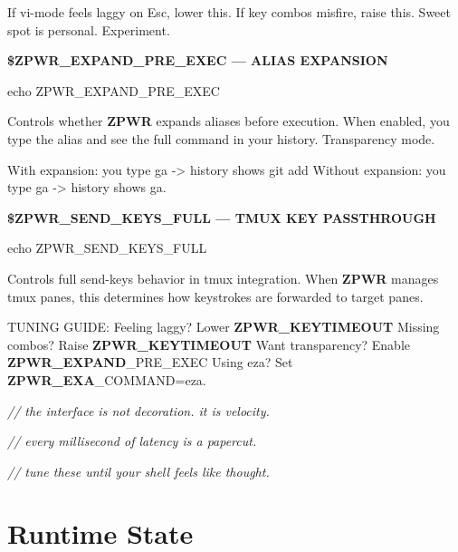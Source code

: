\documentclass[11pt,a4paper,twoside]{book}
\begin{document}
If vi-mode feels laggy on Esc, lower this. If key combos misfire, raise this. Sweet spot is personal. Experiment.


\vspace{12pt}
{\bfseries\color{neonyellow} \$\textbf{ZPWR\_EXPAND}\_PRE\_EXEC — ALIAS EXPANSION}\vspace{4pt}

\begin{codebox}
\color{neongreen}echo ZPWR\_EXPAND\_PRE\_EXEC\\
\end{codebox}

Controls whether \textbf{ZPWR} expands aliases before execution. When enabled, you type the alias and see the full command in your history. Transparency mode.

With expansion:    you type ga  -> history shows git add Without expansion: you type ga  -> history shows ga.


\vspace{12pt}
{\bfseries\color{neonyellow} \$\textbf{ZPWR\_SEND}\_KEYS\_FULL — TMUX KEY PASSTHROUGH}\vspace{4pt}

\begin{codebox}
\color{neongreen}echo ZPWR\_SEND\_KEYS\_FULL\\
\end{codebox}

Controls full send-keys behavior in tmux integration. When \textbf{ZPWR} manages tmux panes, this determines how keystrokes are forwarded to target panes.

TUNING GUIDE: Feeling laggy?       Lower \textbf{ZPWR\_KEYTIMEOUT} Missing combos?      Raise \textbf{ZPWR\_KEYTIMEOUT} Want transparency?   Enable \textbf{ZPWR\_EXPAND}\_PRE\_EXEC Using eza?           Set \textbf{ZPWR\_EXA}\_COMMAND=eza.

{\small\itshape\color{dimtext} // the interface is not decoration. it is velocity.}

{\small\itshape\color{dimtext} // every millisecond of latency is a papercut.}

{\small\itshape\color{dimtext} // tune these until your shell feels like thought.}


\vspace{16pt}

\section{Runtime State}
\end{document}
